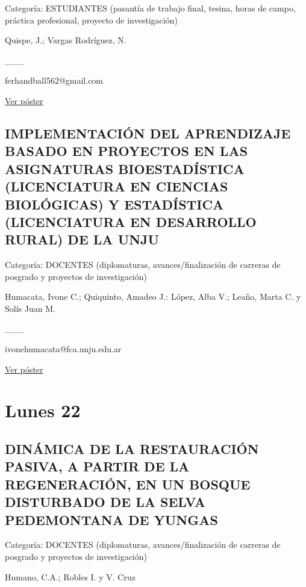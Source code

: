 \documentclass[
  spanish,
  letterpaper,
  DIV=11,
  numbers=noendperiod]{scrreprt}
\begin{document}
Categoría: ESTUDIANTES (pasantía de trabajo final, tesina, horas de
campo, práctica profesional, proyecto de investigación)

Quispe, J.; Vargas Rodríguez, N.

\_\_\_

ferhandball562@gmail.com

\href{https://drive.google.com/open?id=1s4gReRvPVcp1sfLPVN6gbubNCz5f3Fwh}{Ver
póster}

\section{IMPLEMENTACIÓN DEL APRENDIZAJE BASADO EN PROYECTOS EN LAS
ASIGNATURAS BIOESTADÍSTICA (LICENCIATURA EN CIENCIAS BIOLÓGICAS) Y
ESTADÍSTICA (LICENCIATURA EN DESARROLLO RURAL) DE LA
UNJU}\label{implementaciuxf3n-del-aprendizaje-basado-en-proyectos-en-las-asignaturas-bioestaduxedstica-licenciatura-en-ciencias-bioluxf3gicas-y-estaduxedstica-licenciatura-en-desarrollo-rural-de-la-unju}

Categoría: DOCENTES (diplomaturas, avances/finalización de carreras de
posgrado y proyectos de investigación)

Humacata, Ivone C.; Quiquinto, Amadeo J.: López, Alba V.; Leaño, Marta
C. y Solís Juan M.

\_\_\_

ivonehumacata@fca.unju.edu.ar

\href{https://drive.google.com/open?id=15qcb5iwmSjxMiiJL2wlPF_UPsTD3r_rB}{Ver
póster}


\chapter{Lunes 22}\label{lunes-22-1}

\section{DINÁMICA DE LA RESTAURACIÓN PASIVA, A PARTIR DE LA
REGENERACIÓN, EN UN BOSQUE DISTURBADO DE LA SELVA PEDEMONTANA DE
YUNGAS}\label{dinuxe1mica-de-la-restauraciuxf3n-pasiva-a-partir-de-la-regeneraciuxf3n-en-un-bosque-disturbado-de-la-selva-pedemontana-de-yungas}

Categoría: DOCENTES (diplomaturas, avances/finalización de carreras de
posgrado y proyectos de investigación)

Humano, C.A.; Robles I. y V. Cruz
\end{document}
